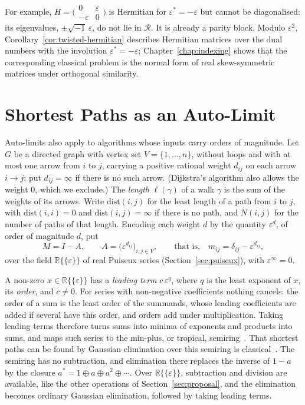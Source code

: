 \documentclass[12pt, a4paper]{report}
\theoremstyle{plain}
\theoremstyle{definition}
\theoremstyle{remark}
\theoremstyle{plain}
\newcommand{\RR}{\mathbb{R}}
\begin{document}
For example, $H=\bigl(\begin{smallmatrix}0&\varepsilon\\-\varepsilon&0\end{smallmatrix}\bigr)$ is Hermitian for $\varepsilon^*=-\varepsilon$ but cannot be diagonalised: its eigenvalues, $\pm\sqrt{-1}\,\varepsilon$, do not lie in $\mathcal R$. It is already a parity block. Modulo $\varepsilon^2$, Corollary~\ref{cor:twisted-hermitian} describes Hermitian matrices over the dual numbers with the involution $\varepsilon^*=-\varepsilon$; Chapter~\ref{chap:indexing} shows that the corresponding classical problem is the normal form of real skew-symmetric matrices under orthogonal similarity.

\section{Shortest Paths as an Auto-Limit}
\label{sec:shortest-paths}
Auto-limits also apply to algorithms whose inputs carry orders of magnitude. Let $G$ be a directed graph with vertex set $V=\{1,\dots,n\}$, without loops and with at most one arrow from $i$ to $j$, carrying a positive rational weight $d_{ij}$ on each arrow $i\to j$; put $d_{ij}=\infty$ if there is no such arrow. (Dijkstra's algorithm also allows the weight $0$, which we exclude.) The \emph{length} $\ell(\gamma)$ of a walk $\gamma$ is the sum of the weights of its arrows. Write $\mathrm{dist}(i,j)$ for the least length of a path from $i$ to $j$, with $\mathrm{dist}(i,i)=0$ and $\mathrm{dist}(i,j)=\infty$ if there is no path, and $N(i,j)$ for the number of paths of that length. Encoding each weight $d$ by the quantity $\varepsilon^d$, of order of magnitude $d$, put
\[ M=I-A,\qquad A=\bigl(\varepsilon^{d_{ij}}\bigr)_{i,j\in V},\qquad\text{that is,}\quad m_{ij}=\delta_{ij}-\varepsilon^{d_{ij}}, \]
over the field $\RR\{\{\varepsilon\}\}$ of real Puiseux series (Section~\ref{sec:puiseux}), with $\varepsilon^\infty=0$.

A non-zero $x\in\RR\{\{\varepsilon\}\}$ has a \emph{leading term} $c\,\varepsilon^q$, where $q$ is the least exponent of $x$, its \emph{order}, and $c\neq0$. For series with non-negative coefficients nothing cancels: the order of a sum is the least order of the summands, whose leading coefficients are added if several have this order, and orders add under multiplication. Taking leading terms therefore turns sums into minima of exponents and products into sums, and maps such series to the min-plus, or tropical, semiring~\cite{MaclaganSturmfels2015}. That shortest paths can be found by Gaussian elimination over this semiring is classical~\cite{Carre1971,GondranMinoux2008}. The semiring has no subtraction, and elimination there replaces the inverse of $1-a$ by the closure $a^*=1\oplus a\oplus a^2\oplus\cdots$. Over $\RR\{\{\varepsilon\}\}$, subtraction and division are available, like the other operations of Section~\ref{sec:proposal}, and the elimination becomes ordinary Gaussian elimination, followed by taking leading terms.
\end{document}
